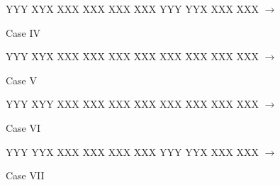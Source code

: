 \documentclass[11pt]{article}
\begin{document}
\begin{figure}[H]
                {Y}{Y}{Y}%
                {X}{Y}{X}%
                {X}{X}{X}%
                {X}{X}{X}%
                {X}{X}{X}%
                {X}{X}{X}%
                {Y}{Y}{Y}%
                {Y}{Y}{X}%
            {X}{X}{X}%
            {X}{X}{X}%
    \qquad$\longrightarrow$\qquad%
    \caption{Case IV}
\end{figure}

\begin{figure}[H]
                {Y}{Y}{Y}%
                {X}{Y}{X}%
                {X}{X}{X}%
                {X}{X}{X}%
                {X}{X}{X}%
                {X}{X}{X}%
                {X}{X}{X}%
                {X}{X}{X}%
            {X}{X}{X}%
            {X}{X}{X}%
    \qquad$\longrightarrow$\qquad%
    \caption{Case V}
\end{figure}

\begin{figure}[H]
                {Y}{Y}{Y}%
                {X}{Y}{Y}%
                {X}{X}{X}%
                {X}{X}{X}%
                {X}{X}{X}%
                {X}{X}{X}%
                {X}{X}{X}%
                {X}{X}{X}%
            {X}{X}{X}%
            {X}{X}{X}%
    \qquad$\longrightarrow$\qquad%
    \caption{Case VI}
\end{figure}

\begin{figure}[H]
                {Y}{Y}{Y}%
                {Y}{Y}{X}%
                {X}{X}{X}%
                {X}{X}{X}%
                {X}{X}{X}%
                {X}{X}{X}%
                {Y}{Y}{Y}%
                {Y}{Y}{X}%
            {X}{X}{X}%
            {X}{X}{X}%
    \qquad$\longrightarrow$\qquad%
    \caption{Case VII}
\end{figure}
\end{document}
